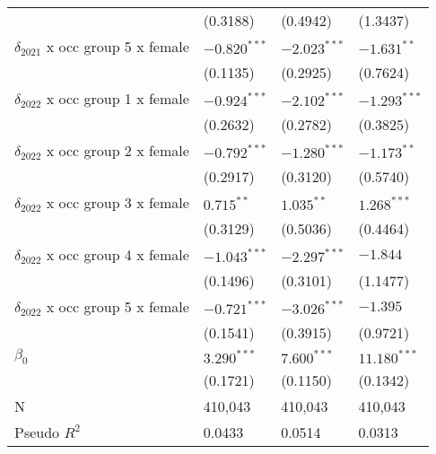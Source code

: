\begin{tabular}{llll}
                                         &           (0.3188) &           (0.4942) &           (1.3437) \\
$\delta_{2021}$ x occ group 5 x female   &     $-0.820^{***}$ &     $-2.023^{***}$ &      $-1.631^{**}$ \\
                                         &           (0.1135) &           (0.2925) &           (0.7624) \\
$\delta_{2022}$ x occ group 1 x female   &     $-0.924^{***}$ &     $-2.102^{***}$ &     $-1.293^{***}$ \\
                                         &           (0.2632) &           (0.2782) &           (0.3825) \\
$\delta_{2022}$ x occ group 2 x female   &     $-0.792^{***}$ &     $-1.280^{***}$ &      $-1.173^{**}$ \\
                                         &           (0.2917) &           (0.3120) &           (0.5740) \\
$\delta_{2022}$ x occ group 3 x female   &       $0.715^{**}$ &       $1.035^{**}$ &      $1.268^{***}$ \\
                                         &           (0.3129) &           (0.5036) &           (0.4464) \\
$\delta_{2022}$ x occ group 4 x female   &     $-1.043^{***}$ &     $-2.297^{***}$ &           $-1.844$ \\
                                         &           (0.1496) &           (0.3101) &           (1.1477) \\
$\delta_{2022}$ x occ group 5 x female   &     $-0.721^{***}$ &     $-3.026^{***}$ &           $-1.395$ \\
                                         &           (0.1541) &           (0.3915) &           (0.9721) \\
$\beta_0$                                &      $3.290^{***}$ &      $7.600^{***}$ &     $11.180^{***}$ \\
                                         &           (0.1721) &           (0.1150) &           (0.1342) \\
N                                        &            410,043 &            410,043 &            410,043 \\
Pseudo $R^2$                             &             0.0433 &             0.0514 &             0.0313 \\
\bottomrule
\end{tabular}
